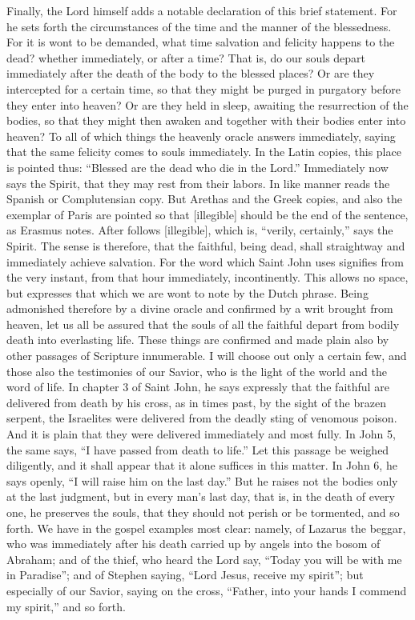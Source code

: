 Finally, the Lord himself adds a notable declaration of this brief statement. For he sets forth the circumstances of the time and the manner of the blessedness. For it is wont to be demanded, what time salvation and felicity happens to the dead? whether immediately, or after a time? That is, do our souls depart immediately after the death of the body to the blessed places? Or are they intercepted for a certain time, so that they might be purged in purgatory before they enter into heaven? Or are they held in sleep, awaiting the resurrection of the bodies, so that they might then awaken and together with their bodies enter into heaven? To all of which things the heavenly oracle answers immediately, saying that the same felicity comes to souls immediately. In the Latin copies, this place is pointed thus: “Blessed are the dead who die in the Lord.” Immediately now says the Spirit, that they may rest from their labors. In like manner reads the Spanish or Complutensian copy. But Arethas and the Greek copies, and also the exemplar of Paris are pointed so that [illegible] should be the end of the sentence, as Erasmus notes. After follows [illegible], which is, “verily, certainly,” says the Spirit. The sense is therefore, that the faithful, being dead, shall straightway and immediately achieve salvation. For the word which Saint John uses signifies from the very instant, from that hour immediately, incontinently. This allows no space, but expresses that which we are wont to note by the Dutch phrase. Being admonished therefore by a divine oracle and confirmed by a writ brought from heaven, let us all be assured that the souls of all the faithful depart from bodily death into everlasting life. These things are confirmed and made plain also by other passages of Scripture innumerable. I will choose out only a certain few, and those also the testimonies of our Savior, who is the light of the world and the word of life. In chapter 3 of Saint John, he says expressly that the faithful are delivered from death by his cross, as in times past, by the sight of the brazen serpent, the Israelites were delivered from the deadly sting of venomous poison. And it is plain that they were delivered immediately and most fully. In John 5, the same says, “I have passed from death to life.” Let this passage be weighed diligently, and it shall appear that it alone suffices in this matter. In John 6, he says openly, “I will raise him on the last day.” But he raises not the bodies only at the last judgment, but in every man’s last day, that is, in the death of every one, he preserves the souls, that they should not perish or be tormented, and so forth. We have in the gospel examples most clear: namely, of Lazarus the beggar, who was immediately after his death carried up by angels into the bosom of Abraham; and of the thief, who heard the Lord say, “Today you will be with me in Paradise”; and of Stephen saying, “Lord Jesus, receive my spirit”; but especially of our Savior, saying on the cross, “Father, into your hands I commend my spirit,” and so forth.

